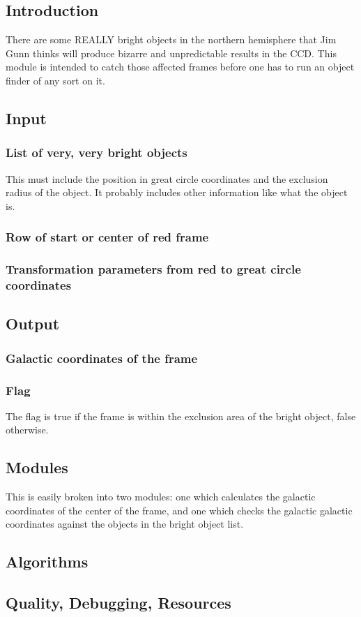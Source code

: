 
\subsection{Introduction}

There are some REALLY bright objects in the northern hemisphere that Jim
Gunn thinks will produce bizarre and unpredictable results in the CCD.
This module is intended to catch those affected frames before one has to
run an object finder of any sort on it.

\subsection{Input}

\subsubsection{List of very, very bright objects}
This must include the position in great circle coordinates and the
exclusion radius of the object.  It probably includes other information
like what the object is.

\subsubsection{Row of start or center of red frame}
\subsubsection{Transformation parameters from red to great circle coordinates}

\subsection{Output}

\subsubsection{Galactic coordinates of the frame}

\subsubsection{Flag}
The flag is true if the frame is within the exclusion area of the bright
object, false otherwise.

\subsection{Modules}

This is easily broken into two modules: one which calculates the galactic
coordinates of the center of the frame, and one which checks the galactic
galactic coordinates against the objects in the bright object list.

\subsection{Algorithms}

\subsection{Quality, Debugging, Resources}

